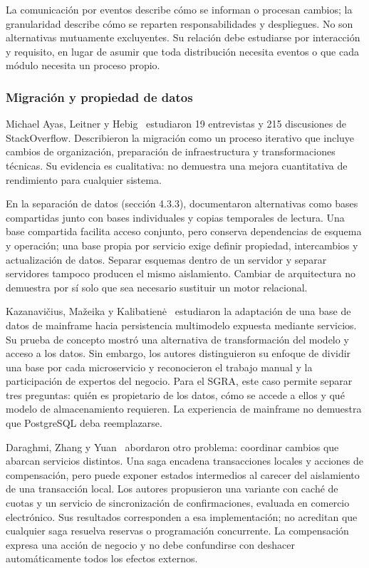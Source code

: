 La comunicación por eventos describe cómo se informan o procesan cambios; la granularidad describe cómo se reparten responsabilidades y despliegues. No son alternativas mutuamente excluyentes. Su relación debe estudiarse por interacción y requisito, en lugar de asumir que toda distribución necesita eventos o que cada módulo necesita un proceso propio.

\subsubsection{Migración y propiedad de datos}
Michael Ayas, Leitner y Hebig~\cite{ayas2023-migration} estudiaron 19 entrevistas y 215 discusiones de StackOverflow. Describieron la migración como un proceso iterativo que incluye cambios de organización, preparación de infraestructura y transformaciones técnicas. Su evidencia es cualitativa: no demuestra una mejora cuantitativa de rendimiento para cualquier sistema.

En la separación de datos (sección 4.3.3), documentaron alternativas como bases compartidas junto con bases individuales y copias temporales de lectura. Una base compartida facilita acceso conjunto, pero conserva dependencias de esquema y operación; una base propia por servicio exige definir propiedad, intercambios y actualización de datos. Separar esquemas dentro de un servidor y separar servidores tampoco producen el mismo aislamiento. Cambiar de arquitectura no demuestra por sí solo que sea necesario sustituir un motor relacional.

Kazanavičius, Mažeika y Kalibatienė~\cite{kazanavicius2022-database} estudiaron la adaptación de una base de datos de mainframe hacia persistencia multimodelo expuesta mediante servicios. Su prueba de concepto mostró una alternativa de transformación del modelo y acceso a los datos. Sin embargo, los autores distinguieron su enfoque de dividir una base por cada microservicio y reconocieron el trabajo manual y la participación de expertos del negocio. Para el SGRA, este caso permite separar tres preguntas: quién es propietario de los datos, cómo se accede a ellos y qué modelo de almacenamiento requieren. La experiencia de mainframe no demuestra que PostgreSQL deba reemplazarse.

Daraghmi, Zhang y Yuan~\cite{daraghmi2022-saga} abordaron otro problema: coordinar cambios que abarcan servicios distintos. Una saga encadena transacciones locales y acciones de compensación, pero puede exponer estados intermedios al carecer del aislamiento de una transacción local. Los autores propusieron una variante con caché de cuotas y un servicio de sincronización de confirmaciones, evaluada en comercio electrónico. Sus resultados corresponden a esa implementación; no acreditan que cualquier saga resuelva reservas o programación concurrente. La compensación expresa una acción de negocio y no debe confundirse con deshacer automáticamente todos los efectos externos.

